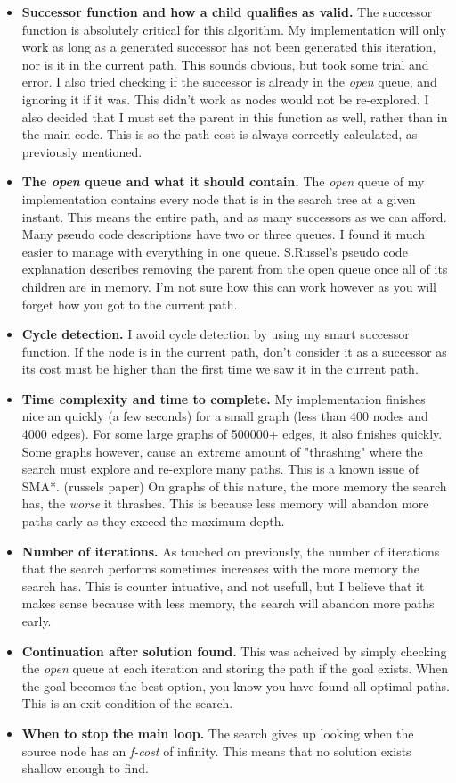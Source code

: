 \documentclass[]{article}
\begin{document}
\begin{itemize}
	\item \textbf{Successor function and how a child qualifies as valid.} The successor function is absolutely critical for this algorithm. My implementation will only work as long as a generated successor has not been generated this iteration, nor is it in the current path. This sounds obvious, but took some trial and error. I also tried checking if the successor is already in the \textit{open} queue, and ignoring it if it was. This didn't work as nodes would not be re-explored. I also decided that I must set the parent in this function as well, rather than in the main code. This is so the path cost is always correctly calculated, as previously mentioned.
	\item \textbf{The \textit{open} queue and what it should contain.} The \textit{open} queue of my implementation contains every node that is in the search tree at a given instant. This means the entire path, and as many successors as we can afford. Many pseudo code descriptions have two or three queues. I found it much easier to manage with everything in one queue. S.Russel's pseudo code explanation describes removing the parent from the open queue once all of its children are in memory. I'm not sure how this can work however as you will forget how you got to the current path.
	\item \textbf{Cycle detection.} I avoid cycle detection by using my smart successor function. If the node is in the current path, don't consider it as a successor as its cost must be higher than the first time we saw it in the current path.
	\item \textbf{Time complexity and time to complete.} My implementation finishes nice an quickly (a few seconds) for a small graph (less than 400 nodes and 4000 edges). For some large graphs of 500000+ edges, it also finishes quickly. Some graphs however, cause an extreme amount of "thrashing" where the search must explore and re-explore many paths. This is a known issue of SMA*. (russels paper) On graphs of this nature, the more memory the search has, the \textit{worse} it thrashes. This is because less memory will abandon more paths early as they exceed the maximum depth.  
	\item \textbf{Number of iterations.} As touched on previously, the number of iterations that the search performs sometimes increases with the more memory the search has. This is counter intuative, and not usefull, but I believe that it makes sense because with less memory, the search will abandon more paths early.
	\item \textbf{Continuation after solution found.} This was acheived by simply checking the \textit{open} queue at each iteration and storing the path if the goal exists. When the goal becomes the best option, you know you have found all optimal paths. This is an exit condition of the search.
	\item \textbf{When to stop the main loop.} The search gives up looking when the source node has an \textit{f-cost} of infinity. This means that no solution exists shallow enough to find.
	
	
\end{itemize}
\end{document}
